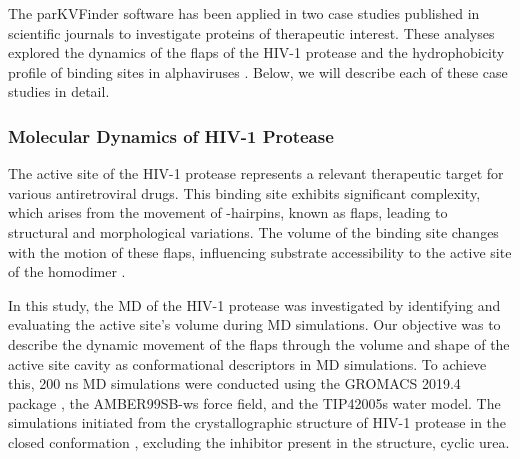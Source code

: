 \documentclass[Ingles]{phdthesis}
\begin{document}
The parKVFinder software has been applied in two case studies published in scientific journals to investigate proteins of therapeutic interest. These analyses explored the dynamics of the flaps of the \ac{HIV-1} protease \cite{guerra2020} and the hydrophobicity profile of binding sites in alphaviruses \cite{ribeiro2021}. Below, we will describe each of these case studies in detail.

\subsubsection{Molecular Dynamics of HIV-1 Protease \label{sec:md-hiv1-protease}}

The active site of the HIV-1 protease represents a relevant therapeutic target for various antiretroviral drugs. This binding site exhibits significant complexity, which arises from the movement of \textbeta-hairpins, known as flaps, leading to structural and morphological variations. The volume of the binding site changes with the motion of these flaps, influencing substrate accessibility to the active site of the homodimer \cite{lam1994,soares2016}.

In this study, the \acs{MD} of the HIV-1 protease was investigated by identifying and evaluating the active site's volume during \acs{MD} simulations. Our objective was to describe the dynamic movement of the flaps through the volume and shape of the active site cavity as conformational descriptors in \acs{MD} simulations. To achieve this, 200 ns \acs{MD} simulations were conducted using the GROMACS 2019.4 package \cite{gromacs}, the AMBER99SB-ws force field, and the TIP42005s water model. The simulations initiated from the crystallographic structure of HIV-1 protease in the closed conformation \cite{lam1994}, excluding the inhibitor present in the structure, cyclic urea.
\end{document}
